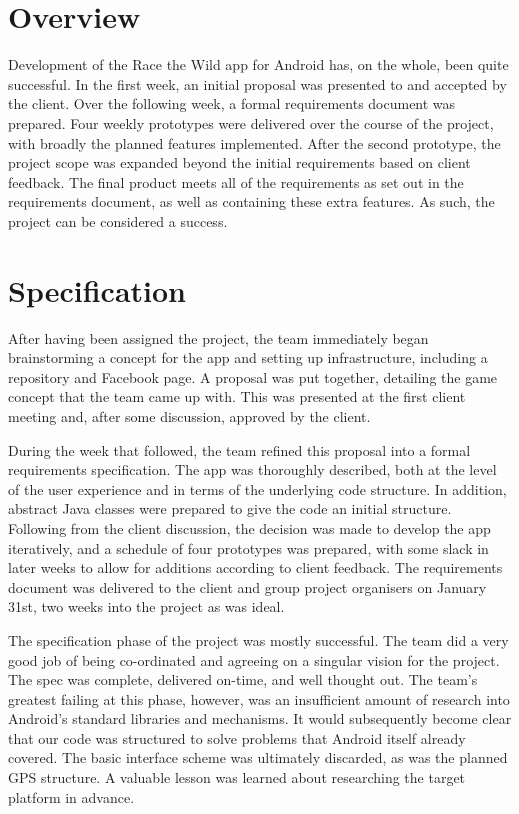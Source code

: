 \documentclass[12pt,a4paper,twoside]{article}
\begin{document}

\newpage
\pagestyle{empty}
\cleardoublepage                             %
\newpage

\section{Overview}

Development of the Race the Wild app for Android has, on the whole, been quite successful. 
In the first week, an initial proposal was presented to and accepted by the client. 
Over the following week, a formal requirements document was prepared. 
Four weekly prototypes were delivered over the course of the project, with broadly the planned features implemented. 
After the second prototype, the project scope was expanded beyond the initial requirements based on client feedback. 
The final product meets all of the requirements as set out in the requirements document, as well as containing these extra features. 
As such, the project can be considered a success.

\section{Specification}

After having been assigned the project, the team immediately began brainstorming a concept for the app and setting up infrastructure, including a repository and Facebook page. 
A proposal was put together, detailing the game concept that the team came up with. 
This was presented at the first client meeting and, after some discussion, approved by the client.

During the week that followed, the team refined this proposal into a formal requirements specification. 
The app was thoroughly described, both at the level of the user experience and in terms of the underlying code structure. 
In addition, abstract Java classes were prepared to give the code an initial structure. 
Following from the client discussion, the decision was made to develop the app iteratively, and a schedule of four prototypes was prepared, with some slack in later weeks to allow for additions according to client feedback. 
The requirements document was delivered to the client and group project organisers on January 31st, two weeks into the project as was ideal.

The specification phase of the project was mostly successful. 
The team did a very good job of being co-ordinated and agreeing on a singular vision for the project. 
The spec was complete, delivered on-time, and well thought out. 
The team's greatest failing at this phase, however, was an insufficient amount of research into Android's standard libraries and mechanisms. 
It would subsequently become clear that our code was structured to solve problems that Android itself already covered. 
The basic interface scheme was ultimately discarded, as was the planned GPS structure. 
A valuable lesson was learned about researching the target platform in advance.
\end{document}
